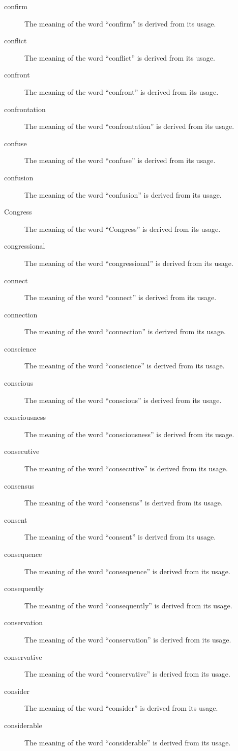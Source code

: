 \documentclass[12pt, letterpaper]{memoir}
\begin{document}
\begin{description}
\item[confirm] The meaning of the word ``confirm'' is derived from its usage.
\item[conflict] The meaning of the word ``conflict'' is derived from its usage.
\item[confront] The meaning of the word ``confront'' is derived from its usage.
\item[confrontation] The meaning of the word ``confrontation'' is derived from its usage.
\item[confuse] The meaning of the word ``confuse'' is derived from its usage.
\item[confusion] The meaning of the word ``confusion'' is derived from its usage.
\item[Congress] The meaning of the word ``Congress'' is derived from its usage.
\item[congressional] The meaning of the word ``congressional'' is derived from its usage.
\item[connect] The meaning of the word ``connect'' is derived from its usage.
\item[connection] The meaning of the word ``connection'' is derived from its usage.
\item[conscience] The meaning of the word ``conscience'' is derived from its usage.
\item[conscious] The meaning of the word ``conscious'' is derived from its usage.
\item[consciousness] The meaning of the word ``consciousness'' is derived from its usage.
\item[consecutive] The meaning of the word ``consecutive'' is derived from its usage.
\item[consensus] The meaning of the word ``consensus'' is derived from its usage.
\item[consent] The meaning of the word ``consent'' is derived from its usage.
\item[consequence] The meaning of the word ``consequence'' is derived from its usage.
\item[consequently] The meaning of the word ``consequently'' is derived from its usage.
\item[conservation] The meaning of the word ``conservation'' is derived from its usage.
\item[conservative] The meaning of the word ``conservative'' is derived from its usage.
\item[consider] The meaning of the word ``consider'' is derived from its usage.
\item[considerable] The meaning of the word ``considerable'' is derived from its usage.

\end{description}
\end{document}
